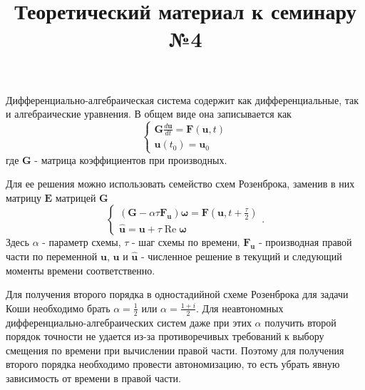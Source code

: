 \documentclass{article}
\title{Теоретический материал к семинару №4}
\date{}
\begin{document}
\maketitle

Дифференциально-алгебраическая система содержит как дифференциальные, так и алгебраические уравнения. В общем виде она записывается как
\begin{equation} \label{c4eq1}
	\begin{cases}
		\displaystyle \mathbf{G} \frac{d\mathbf{u}}{dt} = \mathbf{F} \left( \mathbf{u}, t \right) \\
		\mathbf{u}(t_0) = \mathbf{u}_0
	\end{cases}
\end{equation}
где $\mathbf{G}$ - матрица коэффициентов при производных. 

Для ее решения можно использовать семейство схем Розенброка, заменив в них матрицу $\mathbf{E}$ матрицей $\mathbf{G}$  
\begin{equation} \label{c4eq2}
	\begin{cases}
		\displaystyle \left( \mathbf{G} - \alpha \tau \mathbf{F_u} \right) \boldsymbol{\omega} = \mathbf{F} \left( \mathbf{u}, t + \frac{\tau}{2} \right) \\
		\mathbf{\hat{u}} = \mathbf{u} + \tau \operatorname{Re} \boldsymbol{\omega}
	\end{cases}.
\end{equation}
Здесь $\alpha$ - параметр схемы, $\tau$ - шаг схемы по времени, $\mathbf{F_u}$ - производная правой части по переменной $\mathbf{u}$, $\mathbf{u}$ и $\mathbf{\hat{u}}$ - численное решение в текущий и следующий моменты времени соответственно.

Для получения второго порядка в одностадийной схеме Розенброка для задачи Коши необходимо брать
$\alpha = \frac{1}{2}$ или $\alpha = \frac{1+i}{2}$. Для неавтономных дифференциально-алгебраических систем даже при этих $\alpha$ получить второй порядок точности не удается из-за противоречивых требований к выбору смещения по времени при вычислении правой части. Поэтому для получения второго порядка необходимо провести автономизацию, то есть убрать явную зависимость от времени в правой части.

\newpage
\end{document}
